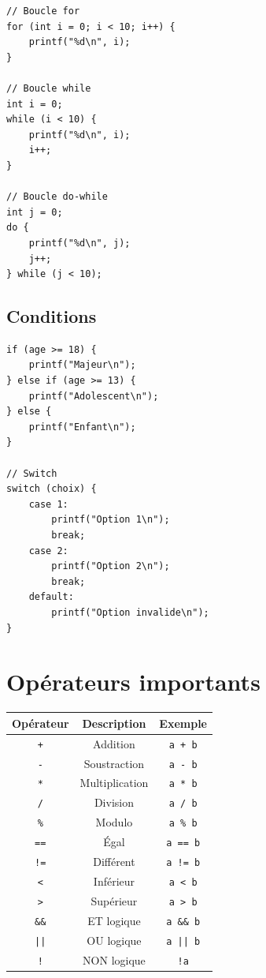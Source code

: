 \documentclass[12pt,a4paper]{article}
\begin{document}
\begin{lstlisting}
// Boucle for
for (int i = 0; i < 10; i++) {
    printf("%d\n", i);
}

// Boucle while
int i = 0;
while (i < 10) {
    printf("%d\n", i);
    i++;
}

// Boucle do-while
int j = 0;
do {
    printf("%d\n", j);
    j++;
} while (j < 10);
\end{lstlisting}

\subsection{Conditions}

\begin{lstlisting}
if (age >= 18) {
    printf("Majeur\n");
} else if (age >= 13) {
    printf("Adolescent\n");
} else {
    printf("Enfant\n");
}

// Switch
switch (choix) {
    case 1:
        printf("Option 1\n");
        break;
    case 2:
        printf("Option 2\n");
        break;
    default:
        printf("Option invalide\n");
}
\end{lstlisting}

\section{Opérateurs importants}

\begin{tabular}{|c|c|c|}
\hline
\textbf{Opérateur} & \textbf{Description} & \textbf{Exemple} \\
\hline
\texttt{+} & Addition & \texttt{a + b} \\
\texttt{-} & Soustraction & \texttt{a - b} \\
\texttt{*} & Multiplication & \texttt{a * b} \\
\texttt{/} & Division & \texttt{a / b} \\
\texttt{\%} & Modulo & \texttt{a \% b} \\
\hline
\texttt{==} & Égal & \texttt{a == b} \\
\texttt{!=} & Différent & \texttt{a != b} \\
\texttt{<} & Inférieur & \texttt{a < b} \\
\texttt{>} & Supérieur & \texttt{a > b} \\
\hline
\texttt{\&\&} & ET logique & \texttt{a \&\& b} \\
\texttt{||} & OU logique & \texttt{a || b} \\
\texttt{!} & NON logique & \texttt{!a} \\
\hline
\end{tabular}
\end{document}
